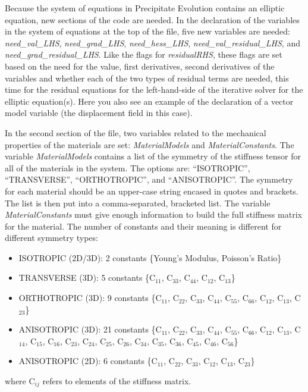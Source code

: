 \documentclass[10pt]{article} %
\begin{document}
Because the system of equations in Precipitate Evolution contains an elliptic equation, new sections of the code are needed. In the declaration of the variables in the system of equations at the top of the file, five new variables are needed: \emph{need\_val\_LHS}, \emph{need\_grad\_LHS}, \emph{need\_hess\_LHS}, \emph{need\_val\_residual\_LHS}, and \emph{need\_grad\_residual\_LHS}. Like the flags for \emph{residualRHS}, these flags are set based on the need for the value, first derivatives, second derivatives of the variables and whether each of the two types of residual terms are needed, this time for the residual equations for the left-hand-side of the iterative solver for the elliptic equation(s). Here you also see an example of the declaration of a vector model variable (the displacement field in this case).

 In the second section of the file, two variables related to the mechanical properties of the materials are set: \emph{MaterialModels} and \emph{MaterialConstants}. The variable \emph{MaterialModels} contains a list of the symmetry of the stiffness tensor for all of the materials in the system. The options are: ``ISOTROPIC'', ``TRANSVERSE'', ``ORTHOTROPIC'', and ``ANISOTROPIC''. The symmetry for each material should be an upper-case string encased in quotes and brackets. The list is then put into a comma-separated, bracketed list. The variable \emph{MaterialConstants} must give enough information to build the full stiffness matrix for the material. The number of constants and their meaning is different for different symmetry types:
 \begin{itemize}
\item ISOTROPIC (2D/3D): 2 constants \{Young's Modulus, Poisson's Ratio\}
\item TRANSVERSE (3D): 5 constants \{C$_{11}$, C$_{33}$, C$_{44}$, C$_{12}$, C$_{13}$\}
\item ORTHOTROPIC (3D): 9 constants \{C$_{11}$, C$_{22}$, C$_{33}$, C$_{44}$, C$_{55}$, C$_{66}$, C$_{12}$, C$_{13}$, C$_{23}$\}
\item ANISOTROPIC (3D): 21 constants \{C$_{11}$, C$_{22}$, C$_{33}$, C$_{44}$, C$_{55}$, C$_{66}$, C$_{12}$, C$_{13}$, C$_{14}$, C$_{15}$, C$_{16}$, C$_{23}$, C$_{24}$, C$_{25}$, C$_{26}$, C$_{34}$, C$_{35}$, C$_{36}$, C$_{45}$, C$_{46}$, C$_{56}$\}
\item ANISOTROPIC (2D): 6 constants \{C$_{11}$, C$_{22}$, C$_{33}$, C$_{12}$, C$_{13}$, C$_{23}$\}
\end{itemize}
where C$_{ij}$ refers to elements of the stiffness matrix.
\end{document}
